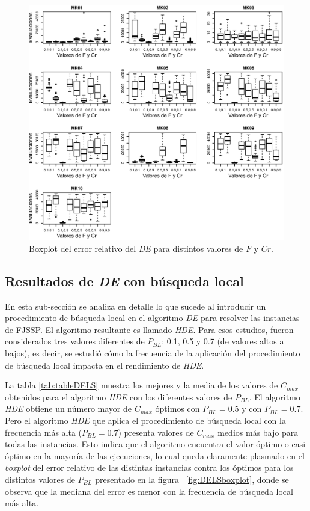 \begin{figure}[H]
   \scriptsize
    \centering
    \includegraphics[trim={0 0.6cm 0 0cm},scale=0.7]{images/DE-10boxplot.eps}
    \caption{Boxplot del error relativo del \textit{DE} para distintos valores de $F$ y $Cr$.}
    \label{fig:DE10boxplot}
\end{figure}


\subsection{Resultados de \textit{DE} con búsqueda local}
En esta sub-sección se analiza en detalle lo que sucede al introducir un procedimiento de búsqueda local en el algoritmo \textit{DE} para resolver las instancias de FJSSP. El algoritmo resultante es llamado \textit{HDE}. Para esos estudios, fueron considerados tres valores diferentes de $P_{BL}$: 0.1, 0.5 y 0.7 (de valores altos a bajos), es decir, se estudió cómo la frecuencia de la aplicación del procedimiento de búsqueda local impacta en el rendimiento de \textit{HDE}.


La tabla \ref{tab:tableDELS} muestra los mejores y la media de los valores de $C_{max}$ obtenidos para el algoritmo \textit{HDE} con los diferentes valores de $P_{BL}$. El algoritmo \textit{HDE} obtiene un número mayor de $C_{max}$ óptimos con $P_{BL} = 0.5$ y con $P_{BL} = 0.7$. Pero el algoritmo \textit{HDE} que aplica el procedimiento de búsqueda local con la frecuencia más alta ($P_{BL} = 0.7$) presenta valores de $C_{max}$ medios más bajo para todas las instancias. Esto indica que el algoritmo encuentra el valor óptimo o casi óptimo en la mayoría de las ejecuciones, lo cual queda claramente plasmado en el \textit{boxplot} del error relativo de las distintas instancias contra los óptimos para los distintos valores de $P_{BL}$ presentado en la figura ~\ref{fig:DELSboxplot}, donde se observa que la mediana del error es menor con la frecuencia de búsqueda local más alta.


